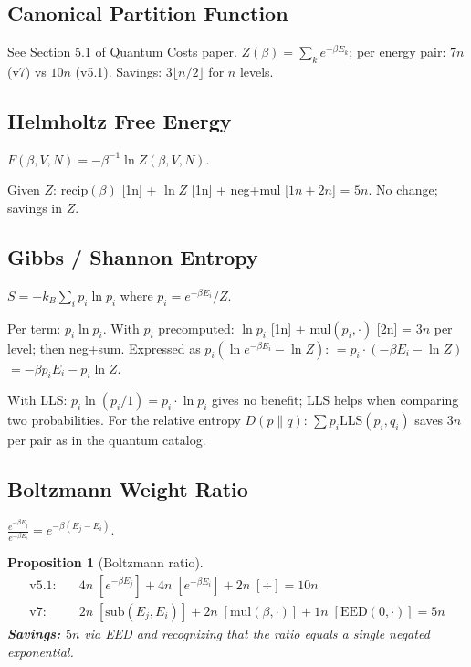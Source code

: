 \documentclass[11pt]{article}
\newtheorem{proposition}[theorem]{Proposition}
\begin{document}
\subsection{Canonical Partition Function}

See Section 5.1 of Quantum Costs paper.
$Z(\beta)=\sum_k e^{-\beta E_k}$; per energy pair: $7n$ (v7) vs $10n$ (v5.1).
Savings: $3\lfloor n/2\rfloor$ for $n$ levels.

\subsection{Helmholtz Free Energy}

$F(\beta,V,N)=-\beta^{-1}\ln Z(\beta,V,N)$.

Given $Z$: $\mathrm{recip}(\beta)$ [1n] + $\ln Z$ [1n] + neg+mul [$1n+2n$] = $5n$.
No change; savings in $Z$.

\subsection{Gibbs / Shannon Entropy}

$S=-k_B\sum_i p_i\ln p_i$ where $p_i=e^{-\beta E_i}/Z$.

Per term: $p_i\ln p_i$. With $p_i$ precomputed:
$\ln p_i$ [1n] + mul$(p_i,\cdot)$ [2n] = $3n$ per level; then neg+sum.
Expressed as $p_i(\ln e^{-\beta E_i} - \ln Z)$:
$= p_i\cdot(-\beta E_i - \ln Z)$
$= -\beta p_i E_i - p_i \ln Z$.

With LLS: $p_i\ln(p_i/1)=p_i\cdot\ln p_i$ gives no benefit; LLS helps when comparing
two probabilities. For the relative entropy $D(p\|q)$:
$\sum p_i\mathrm{LLS}(p_i,q_i)$ saves $3n$ per pair as in the quantum catalog.

\subsection{Boltzmann Weight Ratio}

$\frac{e^{-\beta E_j}}{e^{-\beta E_i}}=e^{-\beta(E_j-E_i)}$.

\begin{proposition}[Boltzmann ratio]
\begin{align*}
\text{v5.1:} &\quad 4n\;[e^{-\beta E_j}]+4n\;[e^{-\beta E_i}]+2n\;[\div] = 10n \\
\text{v7:}   &\quad 2n\;[\mathrm{sub}(E_j,E_i)] + 2n\;[\mathrm{mul}(\beta,\cdot)] + 1n\;[\mathrm{EED}(0,\cdot)] = 5n
\end{align*}
\textbf{Savings: $5n$} via EED and recognizing that the ratio equals a single negated exponential.
\end{proposition}
\end{document}
